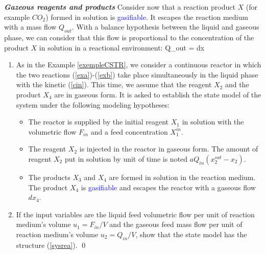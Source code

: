 \begin{exercice}{\bf \em Gazeous reagents and products}
Consider now that a reaction product $X$ (for example $CO_2$) formed in solution is \textcolor{blue}{gasifiable}. It escapes the reaction medium with a mass flow $Q_{out}$. With a balance hypothesis between the liquid and gaseous phase, we can consider that this flow is proportional to the concentration of the product $X$ in solution in a reactional environment:
\eqnn
Q_{out} = dx
\eeqnn
\begin{enumerate}
\item As in the Example \ref{exempleCSTR}, we consider a continuous reactor in which the two reactions (\ref{exa})-(\ref{exb}) take place simultaneously in the liquid phase with the kinetic (\ref{cin}). This time, we assume that the reagent $X_2$ and the product $X_4$ are in gaseous form. It is asked to establish the state model of the system under the following modeling hypotheses:
\begin{itemize} 
\item The reactor is supplied by the initial reagent $X_1$ in solution with the volumetric flow $F_{in}$ and a feed concentration $X_1^{in}$. 
\item The reagent $X_2$ is injected in the reactor in gaseous form. The amount of reagent $X_2$ put in solution by unit of time is noted  $aQ_{in}(x_2^{sat} - x_2)$.
\item The products $X_3$ and $X_4$ are formed in solution in the reaction medium. The product $X_4$ is \textcolor{blue}{gasifiable} and escapes the reactor with a gaseous flow $dx_4$.
\end{itemize}
\item If the input variables are the liquid feed volumetric flow per unit of reaction medium’s volume $u_1 = F_{in}/V$ and the gaseous feed mass flow per unit of reaction medium’s volume  $u_2 = Q_{in}/V$, show that the state model has the structure (\ref{sysrea}). \qed
\end{enumerate}
\end{exercice}
\vv

